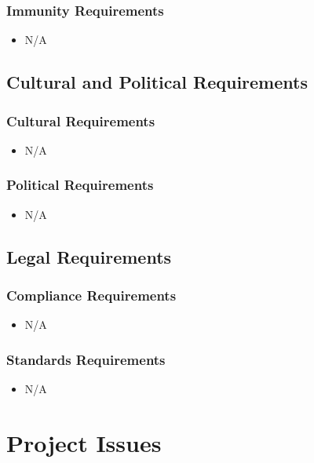 \documentclass [11pt]{article}
\begin{document}
\subsubsection{Immunity Requirements  }
	\begin{itemize}
		\item N/A
	\end{itemize}

\subsection{Cultural and Political Requirements } 
\subsubsection{Cultural Requirements }
	\begin{itemize}
		\item N/A
	\end{itemize}

\subsubsection{Political Requirements }
	\begin{itemize}
		\item N/A
	\end{itemize}


\subsection{Legal Requirements}
\subsubsection{Compliance Requirements }
	\begin{itemize}
		\item N/A
	\end{itemize}
	
\subsubsection{Standards Requirements }
	\begin{itemize}
		\item N/A
	\end{itemize}



\section {Project Issues} 
\end{document}
